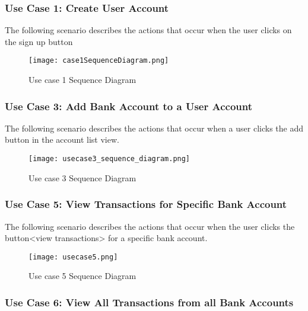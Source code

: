 \documentclass[12pt]{article}
\begin{document}
\subsubsection{Use Case 1: Create User Account}

The following scenario describes the actions that occur when the user clicks on the sign up button

\begin{figure}[H]
\texttt{[image: case1SequenceDiagram.png]}
\caption{Use case 1 Sequence Diagram}
\label{fig:use-case-1-sequence-diagram}
\end{figure}

\clearpage

\subsubsection{Use Case 3: Add Bank Account to a User Account}

The following scenario describes the actions that occur when a user clicks the add button in the account list view.

\begin{figure}[H]
\texttt{[image: usecase3\_sequence\_diagram.png]}
\caption{Use case 3 Sequence Diagram}
\label{fig:use-case-3-sequence-diagram}
\end{figure}

\clearpage

\subsubsection{Use Case 5: View Transactions for Specific Bank Account}

The following scenario describes the actions that occur when the user clicks the button<view transactions> for a specific bank account.

\begin{figure}[H]
\texttt{[image: usecase5.png]}
\caption{Use case 5 Sequence Diagram}
\label{fig:use-case-5-sequence-diagram}
\end{figure}

\clearpage

\clearpage

\subsubsection{Use Case 6: View All Transactions from all Bank Accounts}
\end{document}
